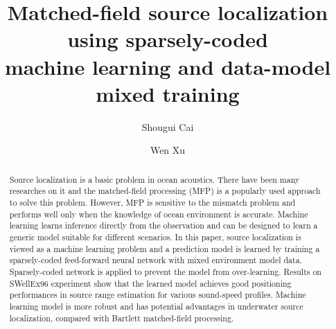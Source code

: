 \documentclass[sigconf]{acmart}
\begin{document}
\title{
Matched-field source localization using sparsely-coded \\machine learning and data-model mixed training
}
\author{Shougui Cai}

\author{Wen Xu}

\renewcommand{\shortauthors}{Shougui Cai.}


\begin{abstract}
Source localization is a basic problem in ocean acoustics. There have been many researches on it and the matched-field processing (MFP) is a popularly used approach to solve this problem. However, MFP is sensitive to the mismatch problem and performs well only when the knowledge of ocean environment is accurate.
Machine learning learns inference directly from the observation and can be
designed to learn a generic model suitable for different scenarios.
In this paper, source localization is viewed as a machine learning problem and a
prediction model is learned by training a sparsely-coded feed-forward neural network with mixed environment model data. Sparsely-coded network is applied to prevent the model from over-learning.
Results on SWellEx96 experiment show that the learned model achieves good positioning performances in source range estimation for various sound-speed profiles.
Machine learning model is more robust and has potential advantages in underwater source localization, compared with Bartlett matched-field processing.
\end{abstract}
\end{document}

